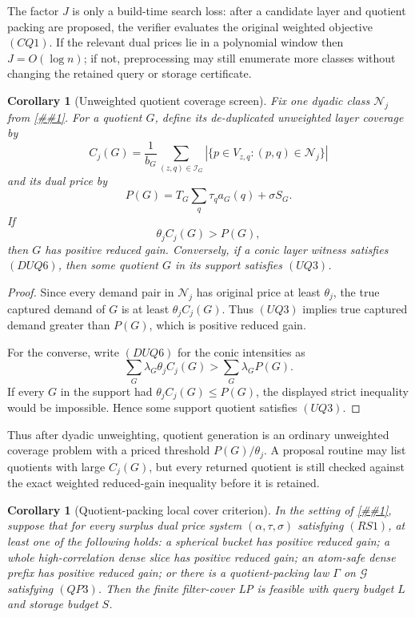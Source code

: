 \documentclass[10pt]{article}
\newcommand{\cref}[1]{\ref{##1}}
\newtheorem{corollary}[theorem]{Corollary}
\theoremstyle{definition}
\begin{document}
The factor \(J\) is only a build-time search loss: after a candidate layer and
quotient packing are proposed, the verifier evaluates the original weighted
objective \((CQ1)\).  If the relevant dual prices lie in a polynomial window then
\(J=O(\log n)\); if not, preprocessing may still enumerate more classes without
changing the retained query or storage certificate.

\begin{corollary}[Unweighted quotient coverage screen]
   \label{cor:unweighted-quotient-coverage-screen}
   Fix one dyadic class \(\mathcal N_j\) from
   \cref{lem:dyadic-quotient-packing}.  For a quotient \(G\), define its
   de-duplicated unweighted layer coverage by
   \[
      C_j(G)
      =
      \frac1{b_G}
      \sum_{(z,q)\in\mathcal I_G}
      \left|
         \{p\in V_{z,q}:(p,q)\in\mathcal N_j\}
      \right|
      \tag{UQ1}
   \]
   and its dual price by
   \[
      P(G)=T_G\sum_q\tau_qa_G(q)+\sigma S_G.
      \tag{UQ2}
   \]
   If
   \[
      \theta_j C_j(G)>P(G),
      \tag{UQ3}
   \]
   then \(G\) has positive reduced gain.  Conversely, if a conic layer witness
   satisfies \((DUQ6)\), then some quotient \(G\) in its support satisfies
   \((UQ3)\).
\end{corollary}

\begin{proof}
   Since every demand pair in \(\mathcal N_j\) has original price at least
   \(\theta_j\), the true captured demand of \(G\) is at least
   \(\theta_j C_j(G)\).  Thus \((UQ3)\) implies true captured demand greater than
   \(P(G)\), which is positive reduced gain.

   For the converse, write \((DUQ6)\) for the conic intensities as
   \[
      \sum_G\lambda_G\theta_j C_j(G)>
      \sum_G\lambda_GP(G).
   \]
   If every \(G\) in the support had \(\theta_jC_j(G)\le P(G)\), the displayed
   strict inequality would be impossible.  Hence some support quotient satisfies
   \((UQ3)\).
\end{proof}

Thus after dyadic unweighting, quotient generation is an ordinary unweighted
coverage problem with a priced threshold \(P(G)/\theta_j\).  A proposal routine
may list quotients with large \(C_j(G)\), but every returned quotient is still
checked against the exact weighted reduced-gain inequality before it is retained.

\begin{corollary}[Quotient-packing local cover criterion]
   \label{cor:quotient-packing-local-cover}
   In the setting of \cref{cor:residual-separator-local-cover}, suppose that for
   every surplus dual price system \((\alpha,\tau,\sigma)\) satisfying \((RS1)\),
   at least one of the following holds:
   a spherical bucket has positive reduced gain; a whole high-correlation dense
   slice has positive reduced gain; an atom-safe dense prefix has positive
   reduced gain; or there is a quotient-packing law \(\Gamma\) on \(\mathcal G\)
   satisfying \((QP3)\).  Then the finite filter-cover LP is feasible with query
   budget \(L\) and storage budget \(S\).
\end{corollary}
\end{document}
